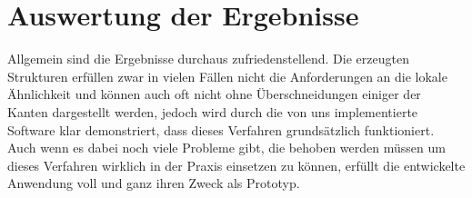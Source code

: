 \section{Auswertung der Ergebnisse}
Allgemein sind die Ergebnisse durchaus zufriedenstellend. Die erzeugten Strukturen erfüllen zwar in vielen Fällen nicht die Anforderungen an die lokale
Ähnlichkeit und können auch oft nicht ohne Überschneidungen einiger der Kanten dargestellt werden, jedoch wird durch die von uns implementierte Software
klar demonstriert, dass dieses Verfahren grundsätzlich funktioniert. Auch wenn es dabei noch viele Probleme gibt, die behoben werden müssen um dieses
Verfahren wirklich in der Praxis einsetzen zu können, erfüllt die entwickelte Anwendung voll und ganz ihren Zweck als Prototyp.
